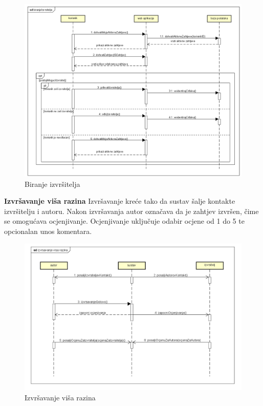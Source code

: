 				\newpage
				\begin{figure}[H]
					\includegraphics[scale=0.6]{slike/biranje-izvrsitelja.png} %
					\centering
					\caption{Biranje izvršitelja}
				\end{figure}
				\newpage
				
				\noindent \large {\textbf{Izvršavanje viša razina}}
				\newline
				\noindent \normalsize Izvršavanje kreće tako da sustav šalje kontakte izvršitelju i autoru. Nakon izvršavanja autor označava da je zahtjev izvršen, čime se omogućava ocjenjivanje. Ocjenjivanje uključuje odabir ocjene od 1 do 5 te opcionalan unos komentara.
				   
				\newpage			
\begin{figure}[H]
					\includegraphics[scale=0.65]{slike/izvrsavanje-visa-razina.png} %
					\centering
					\caption{Izvršavanje viša razina}
				\end{figure}
				
